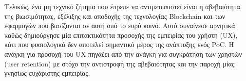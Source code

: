 Τελικώς, ένα μη τεχνικό ζήτημα που έπρεπε να αντιμετωπιστεί είναι η αβεβαιότητα της βιωσιμότητας, εξέλιξης και αποδοχής της τεχνολογίας Blockchain και των εφαρμογών που βασίζονται σε αυτή από το ευρύ κοινό. Αυτό συναίνεσε αρνητικά καθώς δημιούργησε μία επιτακτικότητα προσοχής της εμπειρίας του χρήστη (UX), κάτι που φυσιολογικά δεν αποτελεί σημαντικό μέρος της ανάπτυξης ενός PoC. Η ανάγκη για προσοχή του UX πηγάζει από την ανάγκη για συγκράτηση των χρηστών (user retention) με στόχο την αντιστροφή της αβεβαιότητας και την παροχή μίας γνησίως ευχάριστης εμπειρίας.
